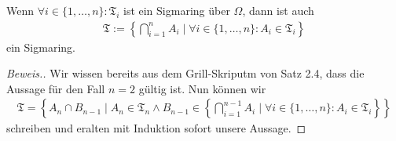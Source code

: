 \begin{lemma}
    Wenn $\forall i \in \{1,\dots,n\}:\mathfrak{T}_i$ ist ein Sigmaring über $\Omega$, dann ist auch 
    \begin{align*}
        \mathfrak{T}:=\left\{\bigcap_{i=1}^{n}A_i \mid \forall i \in \{1,\dots,n\}: A_i \in \mathfrak{T}_i \right\}
    \end{align*}
    ein Sigmaring.
\end{lemma}

\begin{proof}[Beweis.]
    Wir wissen bereits aus dem Grill-Skriputm von Satz 2.4, dass die Aussage für den Fall $n = 2$ gültig ist. Nun können wir 
    \begin{align*}
        \mathfrak{T} = \left\{A_n \cap B_{n-1}\mid A_n \in \mathfrak{T}_n \land B_{n-1} \in \left\{\bigcap_{i=1}^{n-1}A_i \mid \forall i \in \{1,\dots,n\}: A_i \in \mathfrak{T}_i \right\}\right\}
    \end{align*}
    schreiben und eralten mit Induktion sofort unsere Aussage.
\end{proof}